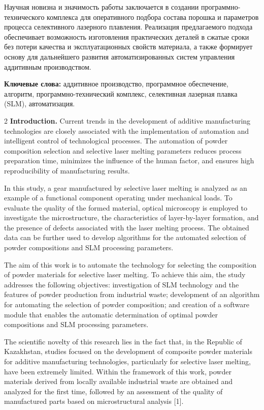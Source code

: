 Научная новизна и значимость работы заключается в создании
программно-технического комплекса для оперативного подбора состава
порошка и параметров процесса селективного лазерного плавления.
Реализация предлагаемого подхода обеспечивает возможность изготовления
практических деталей в сжатые сроки без потери качества и
эксплуатационных свойств материала, а также формирует основу для
дальнейшего развития автоматизированных систем управления аддитивным
производством.

{\bfseries Ключевые слова:} аддитивное производство, программное
обеспечение, алгоритм, программно-технический комплекс, селективная
лазерная плавка (SLM), автоматизация.

\begin{multicols}{2}
{\bfseries Introduction.} Current trends in the development of additive
manufacturing technologies are closely associated with the
implementation of automation and intelligent control of technological
processes. The automation of powder composition selection and selective
laser melting parameters reduces process preparation time, minimizes the
influence of the human factor, and ensures high reproducibility of
manufacturing results.

In this study, a gear manufactured by selective laser melting is
analyzed as an example of a functional component operating under
mechanical loads. To evaluate the quality of the formed material,
optical microscopy is employed to investigate the microstructure, the
characteristics of layer-by-layer formation, and the presence of defects
associated with the laser melting process. The obtained data can be
further used to develop algorithms for the automated selection of powder
compositions and SLM processing parameters.

The aim of this work is to automate the technology for selecting the
composition of powder materials for selective laser melting. To achieve
this aim, the study addresses the following objectives: investigation of
SLM technology and the features of powder production from industrial
waste; development of an algorithm for automating the selection of
powder composition; and creation of a software module that enables the
automatic determination of optimal powder compositions and SLM
processing parameters.

The scientific novelty of this research lies in the fact that, in the
Republic of Kazakhstan, studies focused on the development of composite
powder materials for additive manufacturing technologies, particularly
for selective laser melting, have been extremely limited. Within the
framework of this work, powder materials derived from locally available
industrial waste are obtained and analyzed for the first time, followed
by an assessment of the quality of manufactured parts based on
microstructural analysis {[}1{]}.


\end{multicols}
